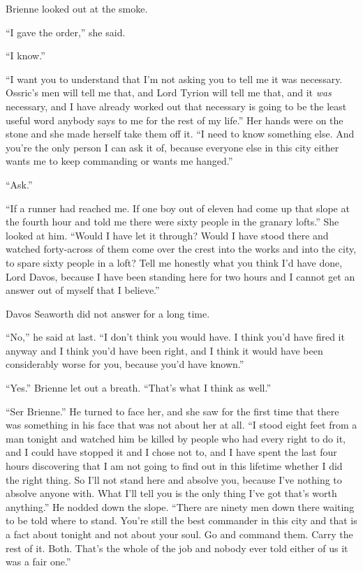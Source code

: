 Brienne looked out at the smoke.

“I gave the order,” she said.

“I know.”

“I want you to understand that I’m not asking you to tell me it was necessary. Ossric’s men will tell me that, and Lord Tyrion will tell me that, and it \textit{was} necessary, and I have already worked out that necessary is going to be the least useful word anybody says to me for the rest of my life.” Her hands were on the stone and she made herself take them off it. “I need to know something else. And you’re the only person I can ask it of, because everyone else in this city either wants me to keep commanding or wants me hanged.”

“Ask.”

“If a runner had reached me. If one boy out of eleven had come up that slope at the fourth hour and told me there were sixty people in the granary lofts.” She looked at him. “Would I have let it through? Would I have stood there and watched forty-across of them come over the crest into the works and into the city, to spare sixty people in a loft? Tell me honestly what you think I’d have done, Lord Davos, because I have been standing here for two hours and I cannot get an answer out of myself that I believe.”

Davos Seaworth did not answer for a long time.

“No,” he said at last. “I don’t think you would have. I think you’d have fired it anyway and I think you’d have been right, and I think it would have been considerably worse for you, because you’d have known.”

“Yes.” Brienne let out a breath. “That’s what I think as well.”

“Ser Brienne.” He turned to face her, and she saw for the first time that there was something in his face that was not about her at all. “I stood eight feet from a man tonight and watched him be killed by people who had every right to do it, and I could have stopped it and I chose not to, and I have spent the last four hours discovering that I am not going to find out in this lifetime whether I did the right thing. So I’ll not stand here and absolve you, because I’ve nothing to absolve anyone with. What I’ll tell you is the only thing I’ve got that’s worth anything.” He nodded down the slope. “There are ninety men down there waiting to be told where to stand. You’re still the best commander in this city and that is a fact about tonight and not about your soul. Go and command them. Carry the rest of it. Both. That’s the whole of the job and nobody ever told either of us it was a fair one.”

